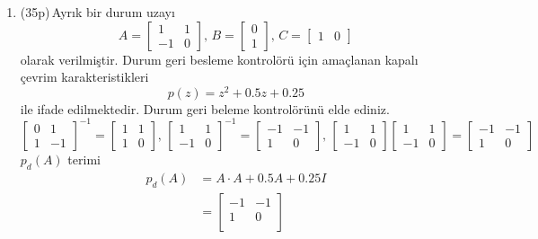 \begin{enumerate}[\bfseries S1.]
    \item (35p)\,Ayrık bir durum uzayı
    \begin{equation}
        A=\begin{bmatrix}1& 1\\-1&0\end{bmatrix},\,B=\begin{bmatrix}0\\1\end{bmatrix},\,C=\begin{bmatrix}1&0\end{bmatrix}
    \end{equation}
    olarak verilmiştir. Durum geri besleme kontrolörü için amaçlanan kapalı çevrim karakteristikleri
    \begin{equation}
        p(z)=z^2+0.5z+0.25
    \end{equation}
    ile ifade edilmektedir. Durum geri beleme kontrolörünü elde ediniz.
    \begin{equation*}
        \begin{bmatrix}0& 1\\1&-1\end{bmatrix}^{-1}=\begin{bmatrix}1& 1\\1&0\end{bmatrix},\,
        \begin{bmatrix}1& 1\\-1&0\end{bmatrix}^{-1}=\begin{bmatrix}-1& -1\\1&0\end{bmatrix},\,
        \begin{bmatrix}1& 1\\-1&0\end{bmatrix}\begin{bmatrix}1& 1\\-1&0\end{bmatrix}=\begin{bmatrix}-1& -1\\1&0\end{bmatrix}
    \end{equation*}
    $p_d(A)$ terimi
    \begin{equation}
    \begin{split}
        p_d(A)&=A\cdot A+0.5A+0.25I\\
        &=\begin{bmatrix}
            -1&    -1\\
            1&    0\\

\end{bmatrix}
\end{split}
\end{equation}
\end{enumerate}
